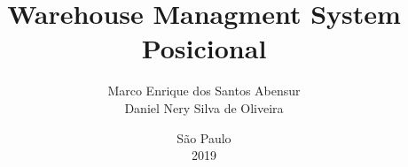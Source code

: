 \documentclass[12pt,openright,oneside,a4paper,brazilian]{abntex2}
\title{Warehouse Managment System Posicional}
\author{Marco Enrique dos Santos Abensur\\
		Daniel Nery Silva de Oliveira}
\date{São Paulo\\2019}
\begin{document}
\imprimircapa
\imprimirfalsafolhaderosto
\imprimirfolhaderosto




\tableofcontents









\end{document}

